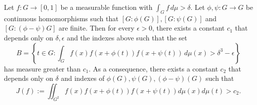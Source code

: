 \begin{theorem*}  
Let $f: G \to [0, 1]$ be a measurable function with $\int_G f \, d \mu > \delta$. Let $\phi, \psi: G \to G$ be continuous homomorphisms such that $[G: \phi(G)], [G: \psi(G)]$ and $[G:(\phi-\psi)G]$ are finite. Then for every $\epsilon > 0$, there exists a constant $c_1$ that depends only on $\delta, \epsilon$ and the indexes above such that the set
\[
    B = \left\{t \in G: \int_G f(x) f(x+ \phi(t)) f(x + \psi(t)) \, d\mu(x) > \delta^3 - \epsilon \right\}
\]
has measure greater than $c_1$. As a consequence, there exists a constant $c_2$ that depends only on $\delta$ and indexes of $\phi(G), \psi(G), (\phi - \psi)(G)$ such that
\[
    J(f) := \iint_{G^2} f(x) f(x+ \phi(t)) f(x+ \psi(t)) d\mu(x) d\mu(t) > c_2.
\]
\end{theorem*}
